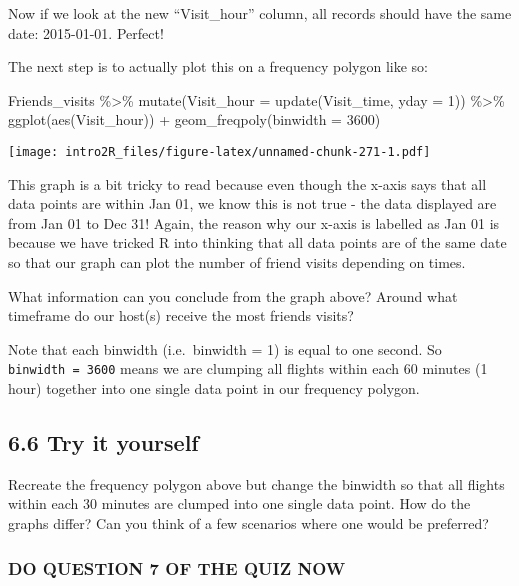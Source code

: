 \documentclass[
]{book}
\newenvironment{Shaded}{\begin{snugshade}}{\end{snugshade}}
\newcommand{\AttributeTok}[1]{\textcolor[rgb]{0.77,0.63,0.00}{#1}}
\newcommand{\DecValTok}[1]{\textcolor[rgb]{0.00,0.00,0.81}{#1}}
\newcommand{\FunctionTok}[1]{\textcolor[rgb]{0.00,0.00,0.00}{#1}}
\newcommand{\NormalTok}[1]{#1}
\newcommand{\SpecialCharTok}[1]{\textcolor[rgb]{0.00,0.00,0.00}{#1}}
\begin{document}
Now if we look at the new ``Visit\_hour'' column, all records should have the same date: 2015-01-01. Perfect!

The next step is to actually plot this on a frequency polygon like so:

\begin{Shaded}
\begin{Highlighting}[]
\NormalTok{ Friends\_visits }\SpecialCharTok{\%\textgreater{}\%}
    \FunctionTok{mutate}\NormalTok{(}\AttributeTok{Visit\_hour =} \FunctionTok{update}\NormalTok{(Visit\_time, }\AttributeTok{yday =} \DecValTok{1}\NormalTok{)) }\SpecialCharTok{\%\textgreater{}\%}
    \FunctionTok{ggplot}\NormalTok{(}\FunctionTok{aes}\NormalTok{(Visit\_hour)) }\SpecialCharTok{+}
    \FunctionTok{geom\_freqpoly}\NormalTok{(}\AttributeTok{binwidth =} \DecValTok{3600}\NormalTok{)}
\end{Highlighting}
\end{Shaded}

\texttt{[image: intro2R\_files/figure-latex/unnamed-chunk-271-1.pdf]}

This graph is a bit tricky to read because even though the x-axis says that all data points are within Jan 01, we know this is not true - the data displayed are from Jan 01 to Dec 31! Again, the reason why our x-axis is labelled as Jan 01 is because we have tricked R into thinking that all data points are of the same date so that our graph can plot the number of friend visits depending on times.

What information can you conclude from the graph above? Around what timeframe do our host(s) receive the most friends visits?

Note that each binwidth (i.e.~binwidth = 1) is equal to one second. So \texttt{binwidth\ =\ 3600} means we are clumping all flights within each 60 minutes (1 hour) together into one single data point in our frequency polygon.

\hypertarget{try-it-yourself-33}{%
\subsection{6.6 Try it yourself}\label{try-it-yourself-33}}

Recreate the frequency polygon above but change the binwidth so that all flights within each 30 minutes are clumped into one single data point. How do the graphs differ? Can you think of a few scenarios where one would be preferred?

\hypertarget{do-question-7-of-the-quiz-now-1}{%
\subsubsection{DO QUESTION 7 OF THE QUIZ NOW}\label{do-question-7-of-the-quiz-now-1}}
\end{document}
